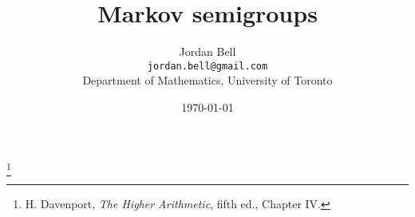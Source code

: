 \documentclass{article}
\theoremstyle{definition}
\begin{document}
\title{Markov semigroups}
\author{Jordan Bell\\ \texttt{jordan.bell@gmail.com}\\Department of Mathematics, University of Toronto}
\date{\today}

\maketitle

\footnote{H. Davenport, {\em The Higher Arithmetic}, fifth ed., Chapter IV.}
\end{document}
